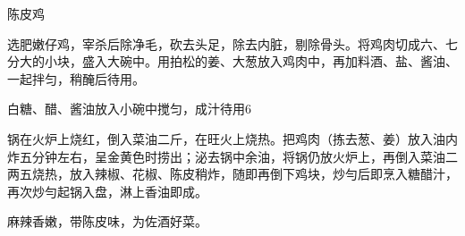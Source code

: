 \begin{recipe}{陈皮鸡}

\ingredients


\cooking

\step 选肥嫩仔鸡，宰杀后除净毛，砍去头足，除去内脏，剔除骨头。将鸡肉切成六、七分大的小块，盛入大碗中。用拍松的姜、大葱放入鸡肉中，再加料酒、盐、酱油、一起拌匀，稍醃后待用。

\step 白糖、醋、酱油放入小碗中搅匀，成汁待用6

\step 锅在火炉上烧红，倒入菜油二斤，在旺火上烧热。把鸡肉（拣去葱、姜）放入油内炸五分钟左右，呈金黄色时捞出；泌去锅中余油，将锅仍放火炉上，再倒入菜油二两五烧热，放入辣椒、花椒、陈皮稍炸，随即再倒下鸡块，炒勻后即烹入糖醋汁，再次炒勻起锅入盘，淋上香油即成。

\notes

麻辣香嫩，带陈皮味，为佐酒好菜。

\end{recipe}

